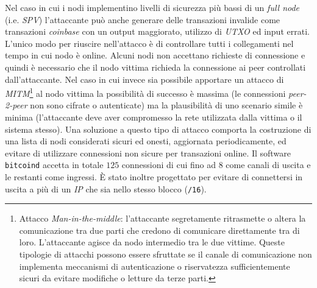 Nel caso in cui i nodi implementino livelli di sicurezza più bassi di un \textit{full node} (i.e. \textit{SPV}) l'attaccante può anche generare delle transazioni invalide come transazioni \textit{coinbase} con un output maggiorato, utilizzo di \textit{UTXO} ed input errati.\newline
L'unico modo per riuscire nell'attacco è di controllare tutti i collegamenti nel tempo in cui nodo è online. Alcuni nodi non accettano richieste di connessione  e quindi è necessario che il nodo vittima richieda la connessione ai peer controllati dall'attaccante. Nel caso in cui invece sia possibile apportare un attacco di \textit{MITM}\footnote{Attacco \textit{Man-in-the-middle}: l'attaccante segretamente ritrasmette o altera la comunicazione tra due parti che credono di comunicare direttamente tra di loro. L'attaccante agisce da nodo intermedio tra le due vittime. Queste tipologie di attacchi possono essere sfruttate se il canale di comunicazione non implementa meccanismi di autenticazione o riservatezza sufficientemente sicuri da evitare modifiche o letture da terze parti.} al nodo vittima la possibilità di successo è massima (le connessioni \textit{peer-2-peer} non sono cifrate o autenticate) ma la plausibilità di uno scenario simile è minima (l'attaccante deve aver compromesso la rete utilizzata dalla vittima o il sistema stesso).\newline
Una soluzione a questo tipo di attacco comporta la costruzione di una lista di nodi considerati sicuri ed onesti, aggiornata periodicamente, ed evitare di utilizzare connessioni non sicure per transazioni online.\newline
Il software \texttt{bitcoind} accetta in totale $125$ connessioni di cui fino ad $8$ come canali di uscita e le restanti come ingressi. È stato inoltre progettato per evitare di connettersi in uscita a più di un \textit{IP} che sia nello stesso blocco (\texttt{/16}).

